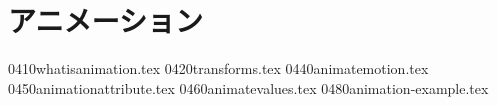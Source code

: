 %
%
\chapter{アニメーション}\label{ChapAnimation}
 \CH 0410whatisanimation.tex
 \CH 0420transforms.tex
 \CH 0440animatemotion.tex
 \CH 0450animationattribute.tex
 \CH 0460animatevalues.tex
 \CH 0480animation-example.tex

